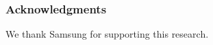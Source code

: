 \documentclass{article}
\begin{document}


\subsubsection*{Acknowledgments}
We thank Samsung for supporting this research.



  
\small  

  
\medskip

\small
\end{document}
